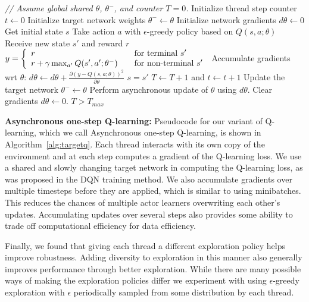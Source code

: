 \documentclass{article} %
\begin{document}
%

\begin{algorithm}[t]
\caption{Asynchronous one-step Q-learning - pseudocode for each actor-learner thread.}
\begin{algorithmic}
\small
\State \emph{// Assume global shared $\theta$, $\theta^-$, and counter $T=0$.}
%
\State Initialize thread step counter $t\gets 0$
\State Initialize target network weights $\theta^- \gets \theta$
\State Initialize network gradients $d\theta \gets 0$
\State Get initial state $s$
\Repeat
\State Take action $a$ with $\epsilon$-greedy policy based on $Q(s,a;\theta)$
\State Receive new state $s'$ and reward $r$
\State $y =
    \left\{
    \begin{array}{l l}
      r  \quad & \text{for terminal } s'\\
      r + \gamma \max_{a'} Q(s', a'; \theta^-) \quad & \text{for non-terminal } s'
    \end{array} \right.$
\State Accumulate gradients wrt $\theta$: $d\theta \gets d\theta + \frac{\partial\left(y - Q(s,a;\theta)\right)^2}{\partial \theta}$
\State $s=s'$
\State $T \gets T + 1$ and $t \gets t + 1$
\State Update the target network $\theta^- \gets \theta$ 
\EndIf
{}
\State Perform asynchronous update of $\theta$ using $d\theta$.
\State Clear gradients $d\theta \gets 0$.
\EndIf
\Until $T > T_{max}$
\end{algorithmic}
\label{alg:targetq}
\end{algorithm}

\textbf{Asynchronous one-step Q-learning:}
Pseudocode for our variant of Q-learning, which we call Asynchronous one-step Q-learning, is shown in Algorithm~\ref{alg:targetq}.
Each thread interacts with its own copy of the environment and at each step computes a gradient of the Q-learning loss.
%
We use a shared and slowly changing target network in computing the Q-learning loss, as was proposed in the DQN training method.
%
We also accumulate gradients over multiple timesteps before they are applied, which is similar to using minibatches.
This reduces the chances of multiple actor learners overwriting each other's updates.
%
Accumulating updates over several steps also provides some ability to trade off computational efficiency for data efficiency.

%
Finally, we found that giving each thread a different exploration policy helps improve robustness.
Adding diversity to exploration in this manner also generally improves performance through better exploration.
While there are many possible ways of making the exploration policies differ we experiment with using $\epsilon$-greedy exploration with $\epsilon$ periodically sampled from some distribution by each thread.
\end{document}
